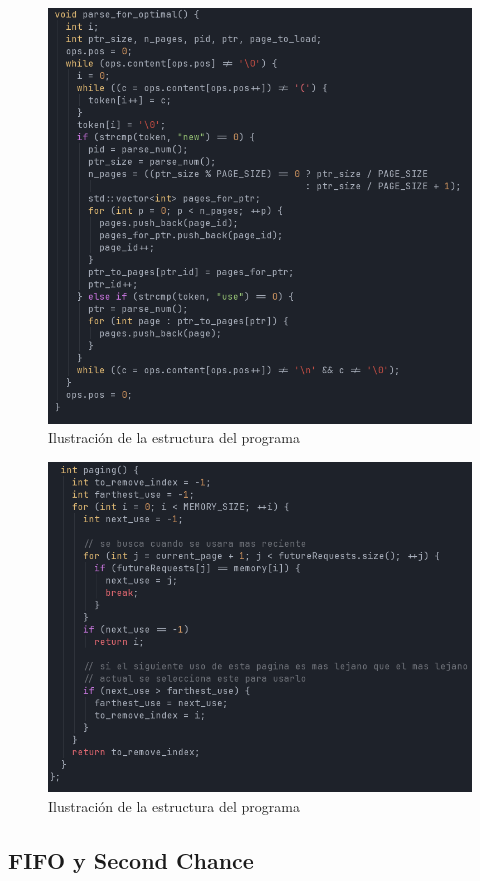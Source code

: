 \documentclass{report}
\begin{document}
\begin{figure}[h]
	\centering
	\includegraphics[width=0.8\linewidth]{figuras/parse_optimal.png}
	\caption{Ilustración de la estructura del programa}
	\label{fig:parse_optimal}
\end{figure}



\begin{figure}[h]
	\centering
	\includegraphics[width=0.8\linewidth]{figuras/optimal.png}
	\caption{Ilustración de la estructura del programa}
	\label{fig:optimal}
\end{figure}


\subsection{FIFO y Second Chance}
\end{document}
